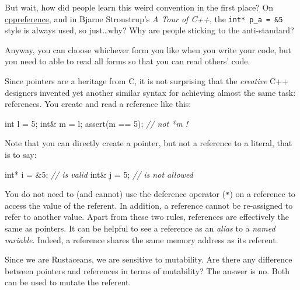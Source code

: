 \documentclass[
]{book}
\newenvironment{Shaded}{\begin{snugshade}}{\end{snugshade}}
\newcommand{\CommentTok}[1]{\textcolor[rgb]{0.56,0.35,0.01}{\textit{#1}}}
\newcommand{\DataTypeTok}[1]{\textcolor[rgb]{0.13,0.29,0.53}{#1}}
\newcommand{\DecValTok}[1]{\textcolor[rgb]{0.00,0.00,0.81}{#1}}
\newcommand{\NormalTok}[1]{#1}
\newcommand{\OtherTok}[1]{\textcolor[rgb]{0.56,0.35,0.01}{#1}}
\begin{document}
But wait, how did people learn this weird convention in the first place? On \href{https://en.cppreference.com/w/cpp/language/pointer}{cppreference}, and in Bjarne Stroustrup's \emph{A Tour of C++}, the \texttt{int*\ p\_a\ =\ \&5} style is always used, so just\ldots why? Why are people sticking to the anti-standard?

Anyway, you can choose whichever form you like when you write your code, but you need to able to read all forms so that you can read others' code.

Since pointers are a heritage from C, it is not surprising that the \emph{creative} C++ designers invented yet another similar syntax for achieving almost the same task: references. You create and read a reference like this:

\begin{Shaded}
\begin{Highlighting}[]
\DataTypeTok{int}\NormalTok{ l = }\DecValTok{5}\NormalTok{;}
\DataTypeTok{int}\NormalTok{\& m = l;}
\OtherTok{assert}\NormalTok{(m == }\DecValTok{5}\NormalTok{); }\CommentTok{// not \textasciigrave{}*m\textasciigrave{} !}
\end{Highlighting}
\end{Shaded}

Note that you can directly create a pointer, but not a reference to a literal, that is to say:

\begin{Shaded}
\begin{Highlighting}[]
\DataTypeTok{int}\NormalTok{* i = \&}\DecValTok{5}\NormalTok{; }\CommentTok{// is valid}
\DataTypeTok{int}\NormalTok{\& j = }\DecValTok{5}\NormalTok{;  }\CommentTok{// is not allowed}
\end{Highlighting}
\end{Shaded}

You do not need to (and cannot) use the deference operator (\texttt{*}) on a reference to access the value of the referent. In addition, a reference cannot be re-assigned to refer to another value. Apart from these two rules, references are effectively the same as pointers. It can be helpful to see a reference as an \emph{alias} to a \emph{named variable}. Indeed, a reference shares the same memory address as its referent.

Since we are Rustaceans, we are sensitive to mutability. Are there any difference between pointers and references in terms of mutability? The answer is no. Both can be used to mutate the referent.
\end{document}
